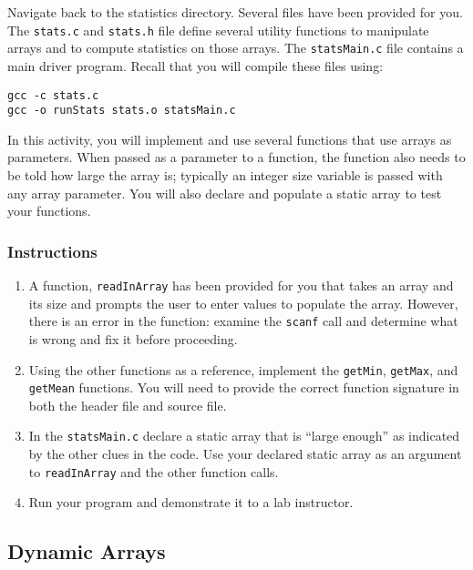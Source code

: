 \documentclass[12pt]{scrartcl}
\begin{document}
Navigate back to the statistics directory.  Several files have been 
provided for you.  The \texttt{stats.c} and \texttt{stats.h} 
file define several utility functions to manipulate arrays and to 
compute statistics on those arrays.  The \texttt{statsMain.c} 
file contains a main driver program.  Recall that you will compile 
these files using:

\begin{verbatim}
gcc -c stats.c
gcc -o runStats stats.o statsMain.c
\end{verbatim}

In this activity, you will implement and use several functions that use 
arrays as parameters.  When passed as a parameter to a function, 
the function also needs to be told how large the array is; typically an 
integer size variable is passed with any array parameter.  You will also 
declare and populate a static array to test your functions.

\subsubsection*{Instructions}

\begin{enumerate}
  \item A function, \texttt{readInArray} has been provided for you 
	that takes an array and its size and prompts the user to enter values 
	to populate the array.  However, there is an error in the function: 
	examine the \texttt{scanf} call and determine what is wrong 
	and fix it before proceeding.
  \item Using the other functions as a reference, implement the 
	\texttt{getMin}, \texttt{getMax}, and \texttt{getMean} 
	functions.  You will need to provide the correct function signature 
	in both the header file and source file.
  \item In the \texttt{statsMain.c} declare a static array that is 
	``large enough'' as indicated by the other clues in the code.  Use your 
	declared static array as an argument to \texttt{readInArray} 
	and the other function calls.
  \item Run your program and demonstrate it to a lab instructor.
\end{enumerate}

\subsection{Dynamic Arrays}
\end{document}
